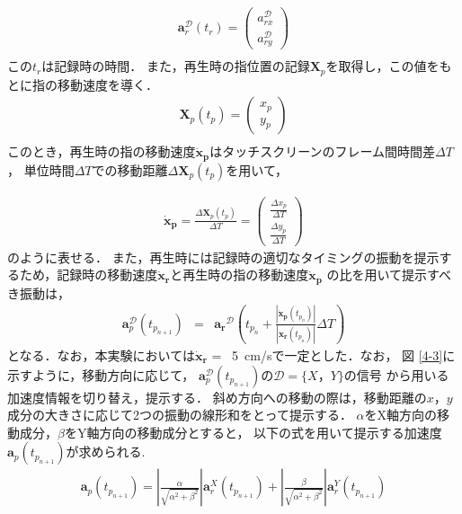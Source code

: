 \begin{eqnarray}
\mathbf{a}_{r}^\mathcal{D}(t_{r})=\left(\begin{matrix}a_{rx}^\mathcal{D} \\ a_{ry}^\mathcal{D}\end{matrix} \right)\\
\end{eqnarray}
この$t_{r}$は記録時の時間．
また，再生時の指位置の記録$\mathbf{X}_{p}$を取得し，この値をもとに指の移動速度を導く．
\begin{eqnarray}
\mathbf{X}_{p}(t_{p})=\left(\begin{matrix}x_{p}\\y_{p}\end{matrix}\right)\\
\end{eqnarray}
このとき，再生時の指の移動速度$\mathbf{\dot{x}_{p}}$はタッチスクリーンのフレーム間時間差$\Delta T$，
単位時間$\Delta T$での移動距離$\Delta\mathbf{X}_{p}(t_{p})$を用いて，

\begin{eqnarray}
\mathbf{\dot{x}_{p}}=\frac{\Delta\mathbf{X}_{p}(t_{p})}{\Delta T}=\left(\begin{matrix}\frac{\Delta x_{p}}{\Delta T}\\\frac{\Delta y_{p}}{\Delta T}\end{matrix}\right)
\end{eqnarray}
のように表せる．
また，再生時には記録時の適切なタイミングの振動を提示するため，記録時の移動速度$\mathbf{\dot{x}_{r}}$と再生時の指の移動速度$\mathbf{\dot{x}_{p}}$
の比を用いて提示すべき振動は，
\begin{eqnarray}
\mathbf{a}_{p}^\mathcal{D}(t_{p_{n+1}}) &=& \mathbf{a_r}^\mathcal{D}(t_{p_{n}} + \frac{|\mathbf{\dot{x}_p}(t_{p_{n}})|}{|\mathbf{\dot{x}_r}(t_{p_{n}})|} \Delta {T})
\end{eqnarray}
となる．なお，本実験においては$\mathbf{\dot{x}_{r}}$ = \ 5\ cm/sで一定とした．なお，
図 \ref{4-3}に示すように，移動方向に応じて，
$\mathbf{a}_{p}^\mathcal{D}(t_{p_{n+1}})$の$\mathcal{D} = \{ X，Y \} $の信号
から用いる加速度情報を切り替え，提示する．
斜め方向への移動の際は，移動距離の$x， y$成分の大きさに応じて2つの振動の線形和をとって提示する．
$\alpha$をX軸方向の移動成分，$\beta$をY軸方向の移動成分とすると，
以下の式を用いて提示する加速度$\mathbf{a}_p(t_{p_{n+1}})$が求められる.
\begin{eqnarray}
\mathbf{a}_p(t_{p_{n+1}})=\displaystyle\left|\frac{\alpha}
{\sqrt{\alpha^2+\beta^2}}\right|\mathbf{a}_{r}^{X}
(t_{p_{n+1}})+\left|\frac{\beta}{\sqrt{\alpha^2+\beta^2}}
\right|\mathbf{a}_{r}^{Y}(t_{p_{n+1}})
\end{eqnarray}

